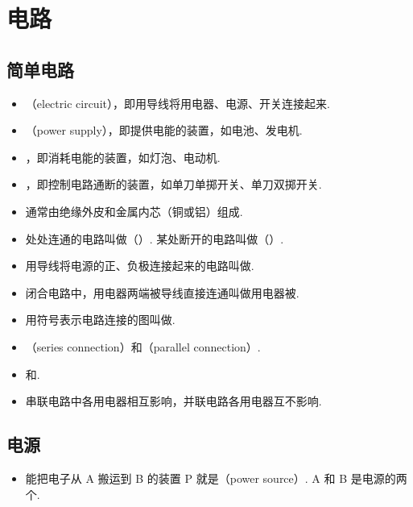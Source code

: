 \section{电路}

\subsection{简单电路}
\begin{itemize}
\item {}（electric circuit），即用导线将用电器、电源、开关连接起来.
\item {}（power supply），即提供电能的装置，如电池、发电机.
\item {}，即消耗电能的装置，如灯泡、电动机.
\item {}，即控制电路通断的装置，如单刀单掷开关、单刀双掷开关.
\item {}通常由绝缘外皮和金属内芯（铜或铝）组成.
\item 处处连通的电路叫做（）. 某处断开的电路叫做（）.
\item {}用导线将电源的正、负极连接起来的电路叫做.
\item 闭合电路中，用电器两端被导线直接连通叫做用电器被.
\item 用符号表示电路连接的图叫做.
\item {}（series connection）和（parallel connection）.
\item {}和.
\item 串联电路中各用电器相互影响，并联电路各用电器互不影响.
\end{itemize}

\subsection{电源}
\begin{itemize}
\item 能把电子从 A 搬运到 B 的装置 P 就是（power source）. A 和 B 是电源的两个.
\end{itemize}

